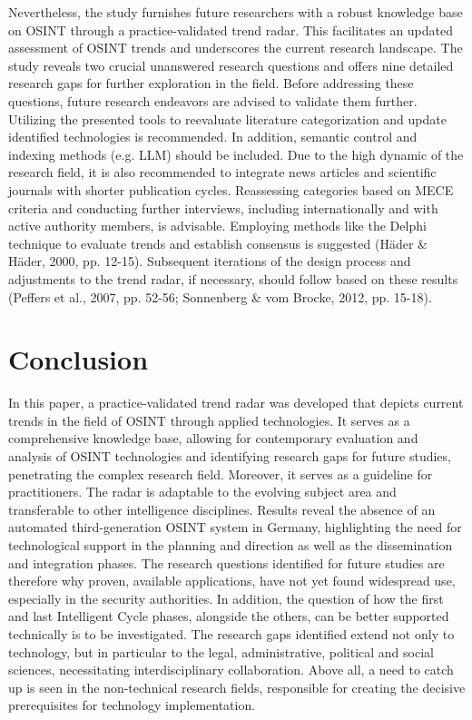 \documentclass[10pt]{article}
\begin{document}
Nevertheless, the study furnishes future researchers with a robust knowledge base on OSINT 
through a practice-validated trend radar. This facilitates an updated assessment of OSINT 
trends and underscores the current research landscape. The study reveals two crucial 
unanswered research questions and offers nine detailed research gaps for further exploration 
in the field. Before addressing these questions, future research endeavors are advised 
to validate them further. Utilizing the presented tools to reevaluate literature 
categorization and update identified technologies is recommended. In addition, semantic 
control and indexing methods (e.g. LLM) should be included. Due to the high dynamic of the research field, 
it is also recommended to integrate news articles and scientific journals with shorter publication cycles. 
Reassessing categories based on MECE criteria and conducting further interviews, including internationally 
and with active authority members, is advisable. Employing methods like the Delphi technique to evaluate 
trends and establish consensus is suggested (Häder & Häder, 2000, pp. 12-15). Subsequent iterations of the design process and adjustments 
to the trend radar, if necessary, should follow based on these results  (Peffers et al., 2007, pp. 52-56; Sonnenberg & vom Brocke, 2012, pp. 15-18).

\section{Conclusion}

In this paper, a practice-validated trend radar was developed that depicts current trends 
in the field of OSINT through applied technologies. It serves as a comprehensive knowledge base, 
allowing for contemporary evaluation and analysis of OSINT technologies and identifying research 
gaps for future studies, penetrating the complex research field. Moreover, it serves as a guideline for practitioners. The radar 
is adaptable to the evolving subject area and transferable to other intelligence disciplines. 
Results reveal the absence of an automated third-generation OSINT system in Germany, highlighting the 
need for technological support in the planning and direction as well as the dissemination and integration phases. 
The research questions identified for future studies are therefore why proven, available applications, 
have not yet found widespread use, especially in the security authorities. 
In addition, the question of how the first and last Intelligent Cycle phases, alongside the others, 
can be better supported technically is to be investigated. The research gaps identified extend 
not only to technology, but in particular to the legal, administrative, political and 
social sciences, necessitating interdisciplinary collaboration. Above all, a need to catch up is seen 
in the non-technical research fields, responsible for creating the decisive prerequisites for technology 
implementation.
\end{document}

